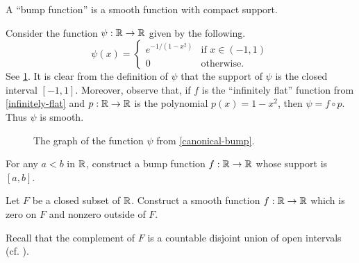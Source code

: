A ``bump function'' is a smooth function with compact support. 

\begin{example} \label{canonical-bump}
	Consider the function $\psi : \mathbb{R} \to \mathbb{R}$ given by the following. 
	\[ \psi(x) = \begin{cases} e^{-1/(1-x^2)} & \text{if } x \in (-1,1) \\ 0 & \text{otherwise}. \end{cases} \]
	See \cref{canonical-bump-graph}. 
	It is clear from the definition of $\psi$ that the support of $\psi$ is the closed interval $[-1,1]$. Moreover, observe that, if $f$ is the ``infinitely flat'' function from \cref{infinitely-flat} and $p : \mathbb{R} \to \mathbb{R}$ is the polynomial $p(x) = 1-x^2$, then $\psi = f \circ p$. Thus $\psi$ is smooth. 
	\begin{figure}[ht]
		\begin{center}
		\end{center}
		\caption{The graph of the function $\psi$ from \cref{canonical-bump}.}  \label{canonical-bump-graph}
	\end{figure}
\end{example}

\begin{exercise}
	For any $a < b$ in $\mathbb{R}$, construct a bump function $f : \mathbb{R} \to \mathbb{R}$ whose support is $[a,b]$. 
\end{exercise}

\begin{exercise}
	Let $F$ be a closed subset of $\mathbb{R}$. Construct a smooth function $f : \mathbb{R} \to \mathbb{R}$ which is zero on $F$ and nonzero outside of $F$. \begin{hint} Recall that the complement of $F$ is a countable disjoint union of open intervals (cf. \cite[theorem 6.17]{protter-morrey}). \end{hint}
\end{exercise}

